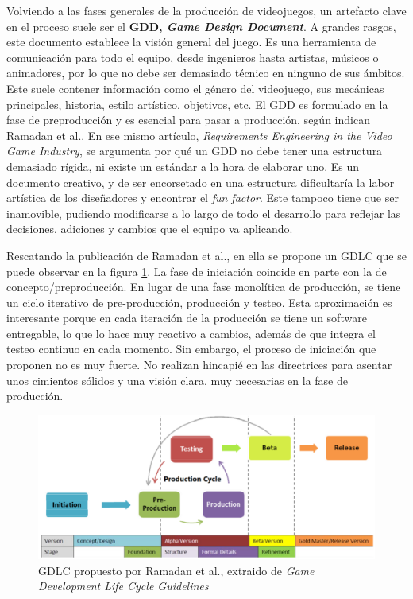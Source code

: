 Volviendo a las fases generales de la producción de videojuegos, un artefacto clave en el proceso suele ser el \textbf{GDD, \textit{Game Design Document}}. A grandes rasgos, este documento establece la visión general del juego. Es una herramienta de comunicación para todo el equipo, desde ingenieros hasta artistas, músicos o animadores, por lo que no debe ser demasiado técnico en ninguno de sus ámbitos. Este suele contener información como el género del videojuego, sus mecánicas principales, historia, estilo artístico, objetivos, etc. El GDD es formulado en la fase de preproducción y es esencial para pasar a producción, según indican Ramadan et al.\cite{ramadan}. En ese mismo artículo, \textit{Requirements Engineering in the Video Game Industry}, se argumenta por qué un GDD no debe tener una estructura demasiado rígida, ni existe un estándar a la hora de elaborar uno. Es un documento creativo, y de ser encorsetado en una estructura dificultaría la labor artística de los diseñadores y encontrar el \textit{fun factor}. Este tampoco tiene que ser inamovible, pudiendo modificarse a lo largo de todo el desarrollo para reflejar las decisiones, adiciones y cambios que el equipo va aplicando.

Rescatando la publicación de Ramadan et al.\cite{ramadan}, en ella se propone un GDLC que se puede observar en la figura \ref{fig:ramadan}. La fase de iniciación coincide en parte con la de concepto/preproducción. En lugar de una fase monolítica de producción, se tiene un ciclo iterativo de pre-producción, producción y testeo. Esta aproximación es interesante porque en cada iteración de la producción se tiene un software entregable, lo que lo hace muy reactivo a cambios, además de que integra el testeo continuo en cada momento. Sin embargo, el proceso de iniciación que proponen no es muy fuerte. No realizan hincapié en las directrices para asentar unos cimientos sólidos y una visión clara, muy necesarias en la fase de producción.

\begin{figure}[h]
    \centering
    \includegraphics[scale=0.3]{img/ramadan-diagram.png}
    \caption[GDLC propuesto por Ramadan et al.]{GDLC propuesto por Ramadan et al., extraido de \textit{Game Development Life Cycle Guidelines}\cite{ramadan}}
    \label{fig:ramadan}
\end{figure}

